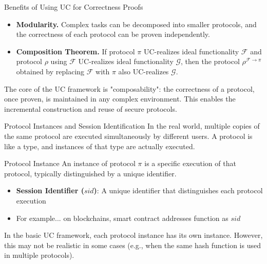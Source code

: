 \documentclass[aspectratio=169,10pt]{beamer}
\newenvironment{proofblock}[1][]
{\begin{block}{#1}\vspace{0.5em}}
{\vspace{0.5em}\end{block}}
\newenvironment{outlineblock}[1][]
{\begin{tcolorbox}[colframe=black, colback=white, boxrule=1pt, boxsep=5pt]}
{\end{tcolorbox}}
\begin{document}
\begin{frame}{Benefits of Using UC for Correctness Proofs}
  \begin{itemize}
    \item \textbf{Modularity. } Complex tasks can be decomposed into smaller protocols, and the correctness of each protocol can be proven independently.
    \item \textbf{Composition Theorem. } If protocol $\pi$ UC-realizes ideal functionality $\mathcal{F}$ and protocol $\rho$ using $\mathcal{F}$ UC-realizes ideal functionality $\mathcal{G}$, then the protocol $\rho^{\mathcal{F} \rightarrow \pi}$ obtained by replacing $\mathcal{F}$ with $\pi$ also UC-realizes $\mathcal{G}$.
  \end{itemize}

  \vspace{1em}

  \begin{outlineblock}{}
    The core of the UC framework is "composability": the correctness of a protocol, once proven, is maintained in any complex environment. This enables the incremental construction and reuse of secure protocols.
  \end{outlineblock}
\end{frame}

\begin{frame}{Protocol Instances and Session Identification}
  In the real world, multiple copies of the same protocol are executed simultaneously by different users.
  A protocol is like a type, and instances of that type are actually executed.
  
  \begin{proofblock}[Protocol Instance]
    An instance of protocol $\pi$ is a specific execution of that protocol, typically distinguished by a unique identifier.
  \end{proofblock}
  
  \begin{itemize}
    \item \textbf{Session Identifier ($sid$)}: A unique identifier that distinguishes each protocol execution
    \item For example... on blockchains, smart contract addresses function as $sid$
  \end{itemize}
  
  \begin{outlineblock}{}
    In the basic UC framework, each protocol instance has its own instance.
    However, this may not be realistic in some cases (e.g., when the same hash function is used in multiple protocols).
  \end{outlineblock}
\end{frame}
\end{document}
